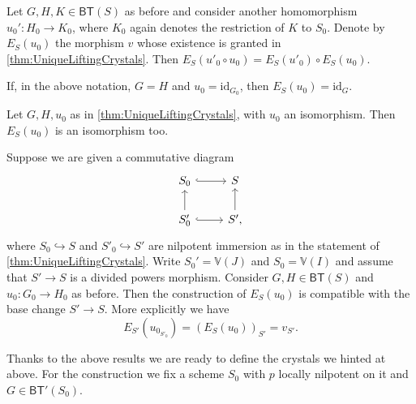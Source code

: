 \documentclass[../Main]{subfiles}
\begin{document}
\begin{cor}\label{thm:M4.2.4.1}
	Let $G, H, K \in \mathsf{BT}(S)$ as before and consider another
	homomorphism $u_0'\colon H_0 \to K_0$, where $K_0$ again denotes
	the restriction of $K$ to $S_0$.
	Denote by $E_S(u_0)$ the morphism $v$ whose existence is granted in
	\cref{thm:UniqueLiftingCrystals}.
	Then $E_S(u'_0 \circ u_0) = E_S(u'_0) \circ E_S(u_0)$.
\end{cor} 


\begin{cor}\label{thm:M4.2.4.2}
	If, in the above notation, $G = H$ and $u_0 = \mathrm{id}_{ G_0 }$,
	then $E_S(u_0) = \mathrm{id}_{ G }$.
\end{cor} 


\begin{cor}\label{thm:M4.2.4.3}
	Let $G,H, u_0$ as in \cref{thm:UniqueLiftingCrystals},
	with $u_0$ an isomorphism.
	Then $E_S(u_0)$ is an isomorphism too.
\end{cor} 


\begin{cor}\label{thm:M4.2.4.4}
	Suppose we are given a commutative diagram
	\begin{equation*}
	\begin{tikzcd}
		S_0 \arrow[r, "", hookrightarrow] &
		S \\
		S_0' \arrow[u, "", rightarrow] 
		\arrow[r, "", hookrightarrow] &
		S' \arrow[u, "", rightarrow] 
	,\end{tikzcd}
	\end{equation*}
	where $S_0 \hookrightarrow S$ and $S'_0 \hookrightarrow S'$ are
	nilpotent immersion as in the statement of \cref{thm:UniqueLiftingCrystals}.
	Write $S_0' = \mathbb{V}(J)$ and $S_0 = \mathbb{V}(I)$
	and assume that $S' \to S$ is a divided powers morphism.
	Consider $G,H \in \mathsf{BT}(S)$ and $u_0\colon G_0 \to H_0$ as before.
	Then the construction of $E_S(u_0)$ is compatible with the base
	change $S' \to S$.
	More explicitly we have
	\begin{equation*}
		E_{S'}(u_{0_{S'_0}}) =
		\left( E_S(u_0) \right)_{S'} = v_{S'}
	.\end{equation*}
\end{cor} 


\noindent
Thanks to the above results we are ready to define the crystals we hinted at above.
For the construction we fix a scheme $S_0$ with $p$ locally
nilpotent on it and $G \in \mathsf{BT}'(S_0)$.
\end{document}
